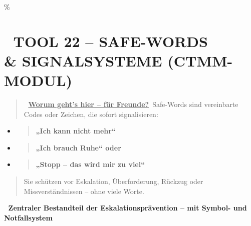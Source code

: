 
\hypertarget{tool-22-safe-words-signalsysteme-ctmm-modul}{\%
\section{\texorpdfstring{\textbf{🛑 TOOL 22 -- SAFE-WORDS \\\& SIGNALSYSTEME (CTMM-MODUL)}}{🛑 TOOL 22 -- SAFE-WORDS \\\& SIGNALSYSTEME (CTMM-MODUL)}}\label{tool-22-safe-words-signalsysteme-ctmm-modul}}

\begin{quote}
🧠 \textbf{\ul{Worum geht's hier -- für Freunde?}}\
Safe-Words sind vereinbarte Codes oder Zeichen, die sofort signalisieren:
\end{quote}

\begin{itemize}
\item
  \begin{quote}
  \textbf{„Ich kann nicht mehr``}
  \end{quote}
\item
  \begin{quote}
  \textbf{„Ich brauch Ruhe`` oder}
  \end{quote}
\item
  \begin{quote}
  \textbf{„Stopp -- das wird mir zu viel``}
  \end{quote}
\end{itemize}

\begin{quote}
Sie schützen vor Eskalation, Überforderung, Rückzug oder Missverständnissen -- ohne viele Worte.
\end{quote}

🧩 \textbf{Zentraler Bestandteil der Eskalationsprävention -- mit Symbol- und Notfallsystem}
